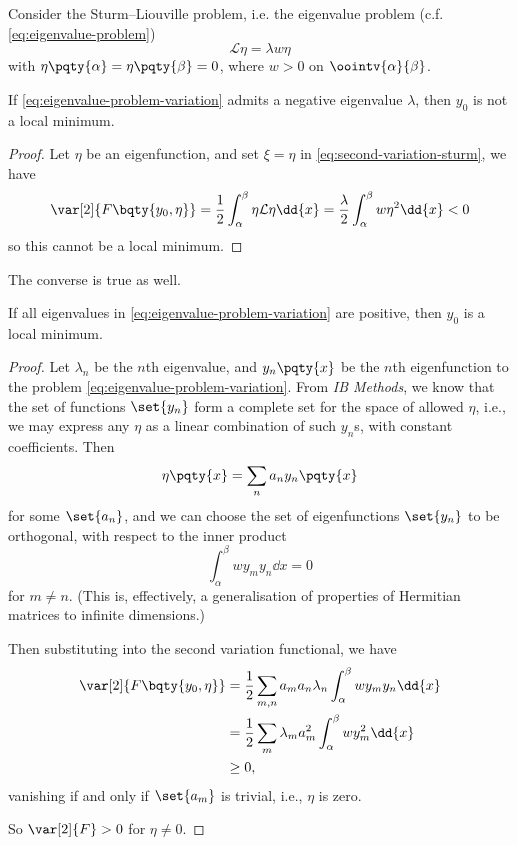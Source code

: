 Consider the Sturm--Liouville problem, i.e. the eigenvalue problem (c.f. \eqref{eq:eigenvalue-problem})
\begin{equation}
    \label{eq:eigenvalue-problem-variation}%
    \mathcal{L} \eta = \lambda w \eta
\end{equation}
with \(\eta\pqty{\alpha} = \eta\pqty{\beta} = 0\), where \(w > 0\) on \(\oointv{\alpha}{\beta}\).

\begin{proposition}
    If \eqref{eq:eigenvalue-problem-variation} admits a negative eigenvalue \(\lambda\), then \(y_0\) is not a local minimum.
\end{proposition}

\begin{proof}
    Let \(\eta\) be an eigenfunction, and set \(\xi = \eta\) in \eqref{eq:second-variation-sturm}, we have
    \[
        \var[2]{F\bqty{y_0, \eta}} = \frac{1}{2} \int_{\alpha}^{\beta} \eta \mathcal{L} \eta \dd{x} = \frac{\lambda}{2} \int_{\alpha}^{\beta} w \eta^2 \dd{x} < 0
    \]
    so this cannot be a local minimum.
\end{proof}

The converse is true as well.

\begin{proposition}
    If all eigenvalues in \eqref{eq:eigenvalue-problem-variation} are positive, then \(y_0\) is a local minimum.
\end{proposition}

\begin{proof}
    Let \(\lambda_n\) be the \(n\)th eigenvalue, and \(y_n\pqty{x}\) be the \(n\)th eigenfunction to the problem \eqref{eq:eigenvalue-problem-variation}. From \textit{IB Methods}, we know that the set of functions \(\set{y_n}\) form a complete set for the space of allowed \(\eta\), i.e., we may express any \(\eta\) as a linear combination of such \(y_n\)s, with constant coefficients. Then
    \[
        \eta\pqty{x} = \sum_{n} a_n y_n \pqty{x}
    \]
    for some \(\set{a_n}\), and we can choose the set of eigenfunctions \(\set{y_n}\) to be orthogonal, with respect to the inner product
    \[
        \int_{\alpha}^{\beta} w y_m y_n \dd{x} = 0
    \]
    for \(m \neq n\). (This is, effectively, a generalisation of properties of Hermitian matrices to infinite dimensions.)

    Then substituting into the second variation functional, we have
    \begin{align*}
        \var[2]{F\bqty{y_0, \eta}} &= \frac{1}{2} \sum_{m, n} a_m a_n \lambda_n \int_{\alpha}^{\beta} w y_m y_n \dd{x} \\
        &= \frac{1}{2} \sum_{m} \lambda_m a_m^2 \int_{\alpha}^{\beta} w y_m^2 \dd{x} \\
        &\geq 0,
    \end{align*}
    vanishing if and only if \(\set{a_m}\) is trivial, i.e., \(\eta\) is zero.

    So \(\var[2]{F} > 0\) for \(\eta \neq 0\).
\end{proof}

